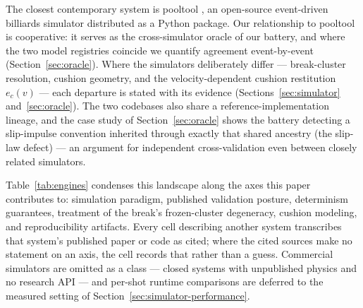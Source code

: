 The closest contemporary system is pooltool \citep{kiefl2024pooltool}, an
open-source event-driven billiards simulator distributed as a Python
package. Our relationship to pooltool is cooperative: it serves as the
cross-simulator oracle of our battery, and where the two model registries
coincide we quantify agreement event-by-event (Section~\ref{sec:oracle}).
Where the simulators deliberately differ --- break-cluster resolution,
cushion geometry, and the velocity-dependent cushion restitution
$e_c(v)$ --- each departure is stated with its evidence
(Sections~\ref{sec:simulator} and~\ref{sec:oracle}). The two codebases
also share a reference-implementation lineage, and the case study of
Section~\ref{sec:oracle} shows the battery detecting a slip-impulse
convention inherited through exactly that shared ancestry (the slip-law
defect) --- an argument for independent
cross-validation even between closely related simulators.

Table~\ref{tab:engines} condenses this landscape along the axes this
paper contributes to: simulation paradigm, published validation posture,
determinism guarantees, treatment of the break's frozen-cluster
degeneracy, cushion modeling, and reproducibility artifacts. Every cell
describing another system transcribes that system's published paper or
code as cited; where the cited sources make no statement on an axis, the
cell records that rather than a guess. Commercial simulators are
omitted as a class --- closed systems with unpublished physics and no
research API \citep{kiefl2024pooltool} --- and per-shot runtime
comparisons are
deferred to the measured setting of
Section~\ref{sec:simulator-performance}.

